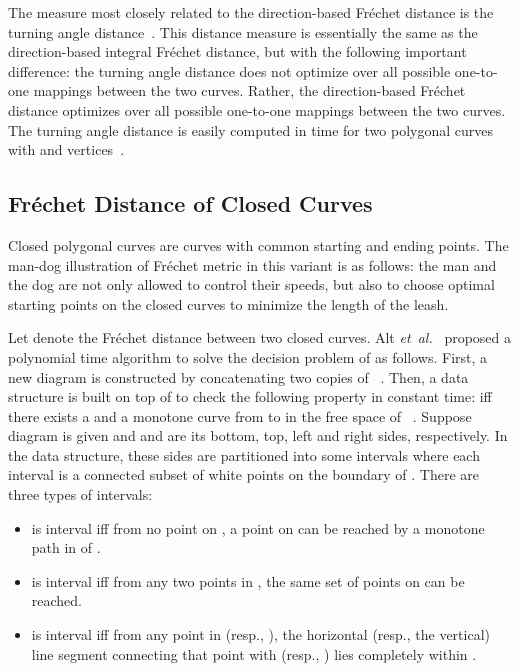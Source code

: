 \documentclass[12pt]{dalthesis}
\newcommand{\etal}{{\em et~al.\/}}
\newcommand{\Frechet}{Fr\'echet }
\begin{document}
The measure most
closely related to the direction-based \Frechet 
distance is the turning angle distance~\cite{Arkin1990}. This distance measure
is essentially the same as the direction-based integral \Frechet distance, but
with the following important difference: the turning angle distance 
does not optimize over all possible one-to-one mappings between the two curves. 
Rather, the direction-based \Frechet distance optimizes over all possible one-to-one mappings between the two curves. 
The turning angle distance is 
easily  computed in  time for two
polygonal curves with  and  vertices~\cite{Arkin1990}. 








\subsection{\Frechet Distance of Closed Curves}
\label{sec:RelatedClosed}
Closed polygonal curves are curves with common starting and ending points. 
The man-dog illustration of \Frechet metric in this variant is as follows:  
the man and the dog 
are not only allowed to control their speeds, 
but also to choose optimal starting points on the closed curves to minimize 
the length of the leash.

Let  denote the \Frechet distance between two closed curves. 
Alt \etal~\cite{AltG95} proposed a polynomial time algorithm 
to solve the decision problem of  as follows.
First, a new diagram  is constructed by 
concatenating two copies of  ~\cite{AltG95}. 
Then, a data structure is built on top of  to check 
the following property in constant time:
  iff there exists
a   and a monotone curve from
 to  in the free space  of ~\cite{AltG95}.
Suppose diagram  is given and 
 and  are its bottom, top, left and right sides, respectively.
In the data structure, these sides are partitioned into some intervals 
where each interval is a connected subset of white points on the 
boundary of . There are three types of intervals: 



\begin{itemize}\itemsep1pt

	\item  is interval iff from no point on , 
	a point on   can be reached by a monotone path 
	in  of .
	
	\item  is interval iff from any two points in , the same set of points on   can be reached.
	
	
	\item  is interval iff from any point in  (resp., ), 
	the horizontal (resp., the vertical) line segment connecting that point with  (resp., ) lies 
	completely within .

\end{itemize} 
\end{document}
